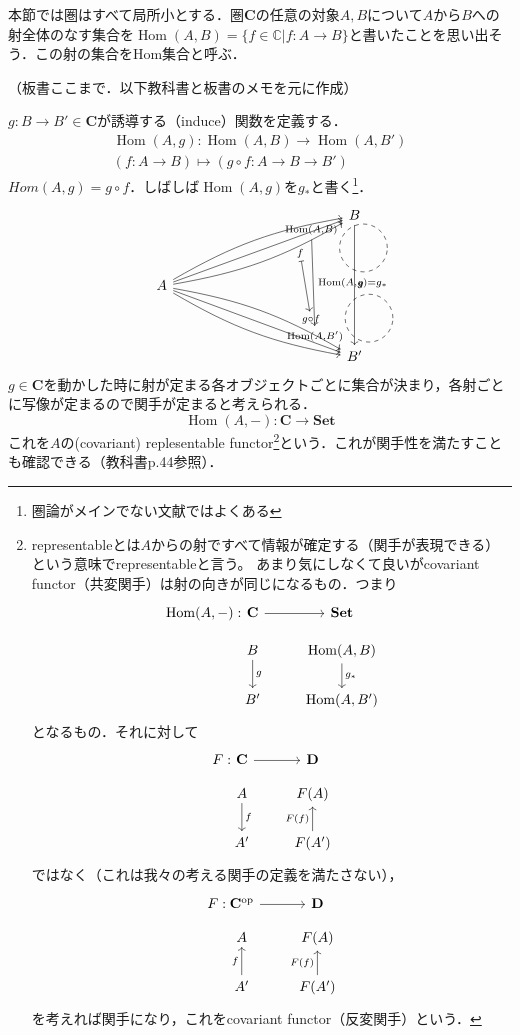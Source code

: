 \documentclass[dvipdfmx,a4j,10pt]{jsarticle}
\theoremstyle{mystyle1}
\theoremstyle{mystyle2}
\DeclareMathOperator{\Hom}{Hom}
\newcommand{\Set}{\mathbf{Set}}
\begin{document}
本節では圏はすべて局所小とする．圏$\mathbf{C}$の任意の対象$A,B$について$A$から$B$への射全体のなす集合を$\Hom(A,B)=\{f\in\mathbb{C}|f:A\to B\}$と書いたことを思い出そう．この射の集合をHom集合と呼ぶ．

（板書ここまで．以下教科書と板書のメモを元に作成）

$g:B\to B'\in\mathbf{C}$が誘導する（induce）関数を定義する．
\[
	\begin{split}
		\Hom(A,g):\Hom(A,B)\to \Hom(A,B') \\
		(f:A\to B)\mapsto (g\circ f:A\to B\to B')
	\end{split}
\]
$Hom(A,g)=g\circ f$．しばしば$\Hom(A,g)$を$g_*$と書く\footnote{圏論がメインでない文献ではよくある}．
\[
	\begin{tikzcd}[column sep=12em,row sep=huge,remember picture]
		& B \arrow[dd,"g"] \\
		A \arrow[ru,""{name=UAB}] \arrow[ru,bend left=10] \arrow[ru,bend right=10,"f"{name=U, below},near end] \arrow[rd,""{name=DABd}] \arrow[rd,bend left=10,"g\circ f"{name=D},near end] \arrow[rd,bend right=10]\\
		& B'
		\arrow[mapsto,from=U,to=D]
	\end{tikzcd}
	\begin{tikzpicture}[overlay,remember picture]
		\draw[dashed] (UAB) circle (0.6);
		\draw[dashed] (DABd) circle (0.6);
		\node[above=3ex,left=1.5em] (HomAB) at (UAB) {$\scriptstyle \Hom(A,B)$};
		\node[below=3ex,left=1.5em] (HomABd) at (DABd) {$\scriptstyle \Hom(A,B')$};
		\draw[->] (HomAB) -- node[right] {$\scriptstyle \Hom(A,g)=g_*$} (HomABd);
	\end{tikzpicture}
\]
$g\in\mathbf{C}$を動かした時に射が定まる各オブジェクトごとに集合が決まり，各射ごとに写像が定まるので関手が定まると考えられる．
\[
	\Hom(A,-):\mathbf{C}\to\Set
\]
これを$A$の(covariant) replesentable functor\footnote{
	representableとは$A$からの射ですべて情報が確定する（関手が表現できる）という意味でrepresentableと言う。
	あまり気にしなくて良いがcovariant functor（共変関手）は射の向きが同じになるもの．つまり
	\[
		\begin{tikzcd}
			\Hom(A,-): &[-3em] \mathbf{C} \arrow[r] & \Set \\[-2ex]
			& B \arrow[d,"g"] & \Hom(A,B) \arrow[d,"g_*"]\\
			& B' & \Hom(A,B')
		\end{tikzcd}
	\]
	となるもの．それに対して
	\[
		\begin{tikzcd}
			F: &[-3em] \mathbf{C} \arrow[r] & \mathbf{D} \\[-2ex]
			& A \arrow[d,"f"] & F(A) \\
			& A' & F(A') \arrow[u,"F(f)"]
		\end{tikzcd}
	\]
	ではなく（これは我々の考える関手の定義を満たさない），
	\[
		\begin{tikzcd}
			F: &[-3em] \mathbf{C}^{\textrm{op}} \arrow[r] & \mathbf{D} \\[-2ex]
			& A  & F(A) \\
			& A' \arrow[u,"f"] & F(A') \arrow[u,"F(f)"]
		\end{tikzcd}
	\]
	を考えれば関手になり，これをcovariant functor（反変関手）という．
}という．これが関手性を満たすことも確認できる（教科書p.44参照）．
\end{document}
